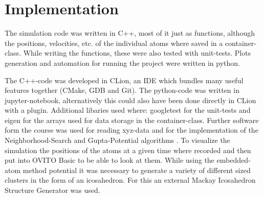 \chapter{Implementation}
\begin{comment}	
	go about structure of the code 
	-> describe Code structure
		
	-> c++ was used to implement the code (mostly functional)
	-> key atoms container Class which holdes all the Values
	-> most functions were tested with googleTest
\end{comment}

\begin{comment}
code written in c++ most of it pretty functional, classes just used 
for the atoms container which holds the arrays 
while writing it also wrote the unittests with googletest
data aquiered form the code plotted with python
also where large simulations had to be run, called the program from the python code

\end{comment}
The simulation code was written in C++, most of it just as functions, although the positions, velocities, etc. of the individual atoms where saved in a container-class.
While writing the functions, these were also tested with unit-tests.
Plots generation and automation for running the project were written in python.

\begin{comment}
developed in CLion which as an integrated git inviroment
Clion builds with Cmake then clang as a compiler
debugger is gdb(nicely hidden)
- additianal bibs where :
	googletest	for unittests
	eigen		for arrays 
- software used form the class itself 
- ovito for visualization
\end{comment}
The C++-code was developed in CLion, an IDE which bundles many useful features together (CMake, GDB and Git).
The python-code was written in jupyter-notebook, alternatively this could also have been done directly in CLion with a plugin. 
Additional libaries used where: googletest \cite{googletest} for the unit-tests and eigen \cite{eigen} for the arrays used for data storage in the container-class. 
Further software form the course was used for reading xyz-data and for the implementation of the Neighborhood-Search and Gupta-Potential algorithms \cite{molDymCourse}. 
To visualize the simulation the positions of the atoms at a given time where recorded and then put into OVITO Basic \cite{ovito} to be able to look at them.
While using the embedded-atom method potential it was necessary to generate a variety of different sized clusters in the form of an icosahedron. For this an external Mackay Icosahedron Structure Generator \cite{icosader} was used.
\begin{comment}
--
code is structured into the milestones, so an individual milestone can be rerun in case of fuckup
parted into h and cpp files as usual
followed the structure of the milestone
\end{comment}

